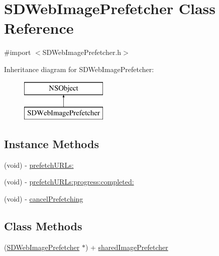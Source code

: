 \hypertarget{interface_s_d_web_image_prefetcher}{}\section{S\+D\+Web\+Image\+Prefetcher Class Reference}
\label{interface_s_d_web_image_prefetcher}


{\ttfamily \#import $<$S\+D\+Web\+Image\+Prefetcher.\+h$>$}

Inheritance diagram for S\+D\+Web\+Image\+Prefetcher\+:\begin{figure}[H]
\begin{center}
\leavevmode
\includegraphics[height=2.000000cm]{interface_s_d_web_image_prefetcher}
\end{center}
\end{figure}
\subsection*{Instance Methods}
\begin{DoxyCompactItemize}
\item 
(void) -\/ \hyperlink{interface_s_d_web_image_prefetcher_aca785918119f2b0d08ee1ff8b5310365}{prefetch\+U\+R\+Ls\+:}
\item 
(void) -\/ \hyperlink{interface_s_d_web_image_prefetcher_afe9785b15d86e127c406bfff04565ba6}{prefetch\+U\+R\+Ls\+:progress\+:completed\+:}
\item 
(void) -\/ \hyperlink{interface_s_d_web_image_prefetcher_ac05c31b5d8d38b478753d62374fc860c}{cancel\+Prefetching}
\end{DoxyCompactItemize}
\subsection*{Class Methods}
\begin{DoxyCompactItemize}
\item 
(\hyperlink{interface_s_d_web_image_prefetcher}{S\+D\+Web\+Image\+Prefetcher} $\ast$) + \hyperlink{interface_s_d_web_image_prefetcher_a68ffcf7977763c9c253742f092c424a5}{shared\+Image\+Prefetcher}
\end{DoxyCompactItemize}
